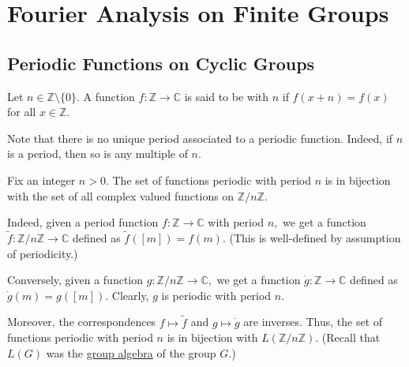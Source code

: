 \documentclass[12pt]{article}	%
\begin{document}
\coverpage

\thispagestyle{empty}
\updated{\today}

\thispagestyle{empty}
\tableofcontents
\pagestyle{fancy}
\setcounter{section}{-1}
\setcounter{page}{1}










\section{Fourier Analysis on Finite Groups}
\subsection{Periodic Functions on Cyclic Groups}

\begin{defn}
    Let $n \in \mathbb{Z} \setminus \{0\}.$ A function $f : \mathbb{Z} \to \mathbb{C}$ is said to be  with  $n$ if $f(x + n) = f(x)$ for all $x \in \mathbb{Z}.$
\end{defn}

Note that there is no unique period associated to a periodic function. Indeed, if $n$ is a period, then so is any multiple of $n.$

\begin{rem}
    Fix an integer $n > 0.$ The set of functions periodic with period $n$ is in bijection with the set of all complex valued functions on $\mathbb{Z}/n\mathbb{Z}.$
    
    Indeed, given a period function $f : \mathbb{Z} \to \mathbb{C}$ with period $n,$ we get a function $\tilde{f} : \mathbb{Z}/n\mathbb{Z} \to \mathbb{C}$ defined as $\tilde{f}([m]) = f(m).$ (This is well-defined by assumption of periodicity.)
    
    Conversely, given a function $g : \mathbb{Z}/n\mathbb{Z} \to \mathbb{C},$ we get a function $\dot{g} : \mathbb{Z} \to \mathbb{C}$ defined as $\dot{g}(m) = g([m]).$ Clearly, $g$ is periodic with period $n.$
    
    Moreover, the correspondences $f \mapsto \tilde{f}$ and $g \mapsto \dot{g}$ are inverses. Thus, the set of functions periodic with period $n$ is in bijection with $L(\mathbb{Z}/n\mathbb{Z}).$ (Recall that $L(G)$ was the \hyperref[defn:groupalg]{group algebra} of the group $G.$)
\end{rem}
\end{document}
